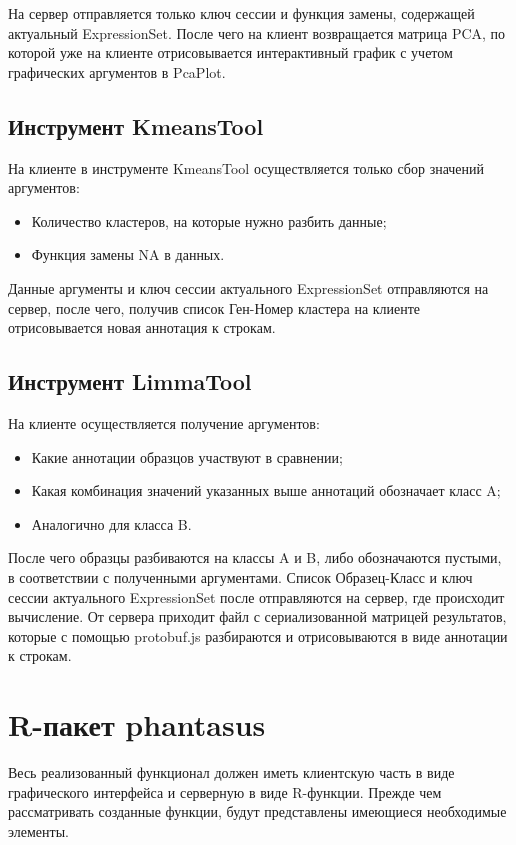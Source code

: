 \documentclass[specification,annotation]{itmo-student-thesis}
\begin{document}
На сервер отправляется только ключ сессии и функция замены, содержащей актуальный ExpressionSet. После чего на клиент возвращается матрица PCA, по которой уже на клиенте отрисовывается интерактивный график с учетом графических аргументов в PcaPlot.

\subsection{Инструмент KmeansTool}
На клиенте в инструменте KmeansTool осуществляется только сбор значений аргументов:
\begin{itemize}
\item Количество кластеров, на которые нужно разбить данные;
\item Функция замены NA в данных.
\end{itemize}

Данные аргументы и ключ сессии актуального ExpressionSet отправляются на сервер, после чего, получив список Ген-Номер кластера на клиенте отрисовывается новая аннотация к строкам.

\subsection{Инструмент LimmaTool}
На клиенте осуществляется получение аргументов:
\begin{itemize}
\item Какие аннотации образцов участвуют в сравнении;
\item Какая комбинация значений указанных выше аннотаций обозначает класс A;
\item Аналогично для класса B.
\end{itemize}

После чего образцы разбиваются на классы A и B, либо обозначаются пустыми, в соответствии с полученными аргументами. Список Образец-Класс и ключ сессии актуального ExpressionSet после отправляются на сервер, где происходит вычисление.
От сервера приходит файл с сериализованной матрицей результатов, которые с помощью protobuf.js разбираются и отрисовываются в виде аннотации к строкам.

\section{R-пакет phantasus}
Весь реализованный функционал должен иметь клиентскую часть в виде графического интерфейса и серверную в виде R-функции.
Прежде чем рассматривать созданные функции, будут представлены имеющиеся необходимые элементы.
\end{document}
